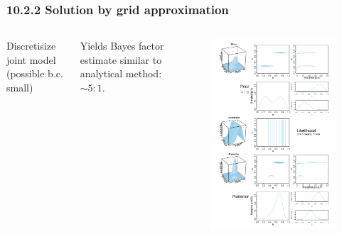 \documentclass[usenames,dvipsnames,table]{beamer}
\begin{document}
\begin{frame}
\frametitle{10.2.2 Solution by grid approximation}
\begin{columns}[c]
Discretisize joint model (possible b.c. small)

\vspace{1em}
Yields Bayes factor estimate similar to analytical method: $\sim 5:1$.
\begin{figure}
\centering
\includegraphics[height=.8\textheight]{img/fig10_3}
\end{figure}
\end{columns}
\end{frame}
\end{document}
